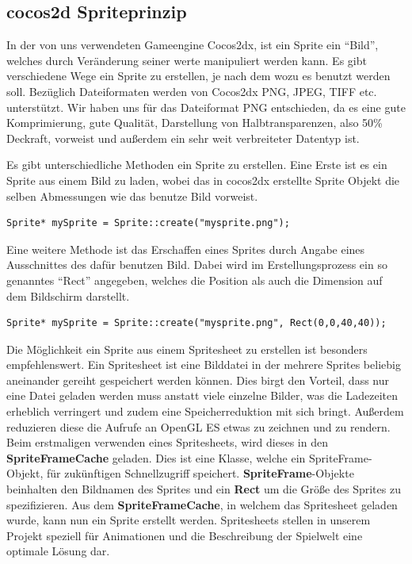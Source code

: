\subsection{cocos2d Spriteprinzip}
In der von uns verwendeten Gameengine Cocos2dx, ist ein Sprite ein “Bild”, welches durch Veränderung seiner werte manipuliert werden kann. Es gibt verschiedene Wege ein Sprite zu erstellen, je nach dem wozu es benutzt werden soll. Bezüglich Dateiformaten werden von Cocos2dx PNG, JPEG, TIFF etc. unterstützt. Wir haben uns für das Dateiformat PNG entschieden, da es eine gute Komprimierung, gute Qualität, Darstellung von Halbtransparenzen, also 50\% Deckraft, vorweist und außerdem ein sehr weit verbreiteter Datentyp ist.

Es gibt unterschiedliche Methoden ein Sprite zu erstellen. Eine Erste ist es ein Sprite aus einem Bild zu laden, wobei das in cocos2dx erstellte Sprite Objekt die selben Abmessungen wie das benutze Bild vorweist. 

\begin{lstlisting}[style=singleline]
Sprite* mySprite = Sprite::create("mysprite.png");
\end{lstlisting}

Eine weitere Methode ist das Erschaffen eines Sprites durch Angabe eines Ausschnittes des dafür benutzen Bild. Dabei wird im Erstellungsprozess ein so genanntes “Rect” angegeben, welches die Position als auch die Dimension auf dem Bildschirm darstellt. 

\begin{lstlisting}[style=singleline]
Sprite* mySprite = Sprite::create("mysprite.png", Rect(0,0,40,40));
\end{lstlisting}

Die Möglichkeit ein Sprite aus einem Spritesheet zu erstellen ist besonders empfehlenswert. Ein Spritesheet ist eine Bilddatei in der mehrere Sprites beliebig aneinander gereiht gespeichert werden können. Dies birgt den Vorteil, dass nur eine Datei geladen werden muss anstatt viele einzelne Bilder, was die Ladezeiten erheblich verringert und zudem eine Speicherreduktion mit sich bringt. Außerdem reduzieren diese die Aufrufe an OpenGL ES etwas zu zeichnen und zu rendern. Beim erstmaligen verwenden eines Spritesheets, wird dieses in den \textbf{SpriteFrameCache} geladen.  Dies ist eine Klasse, welche ein SpriteFrame-Objekt, für zukünftigen Schnellzugriff speichert. \textbf{SpriteFrame}-Objekte beinhalten den Bildnamen des Sprites und ein \textbf{Rect} um die Größe des Sprites zu spezifizieren. Aus dem \textbf{SpriteFrameCache}, in welchem das Spritesheet geladen wurde, kann nun ein Sprite erstellt werden.
Spritesheets stellen in unserem Projekt speziell für Animationen und die Beschreibung der Spielwelt eine optimale Lösung dar. 



